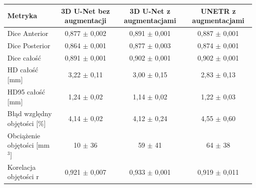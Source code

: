 \begin{tabular}{lccc}
\hline
Metryka & 3D U-Net bez augmentacji & 3D U-Net z augmentacjami & UNETR z augmentacjami \\ \hline
Dice Anterior & 0,877 $\pm$ 0,002 & 0,891 $\pm$ 0,001 & 0,887 $\pm$ 0,001 \\
Dice Posterior & 0,864 $\pm$ 0,001 & 0,877 $\pm$ 0,003 & 0,874 $\pm$ 0,001 \\
Dice całość & 0,891 $\pm$ 0,001 & 0,902 $\pm$ 0,001 & 0,902 $\pm$ 0,001 \\
HD całość [mm] & 3,22 $\pm$ 0,11 & 3,00 $\pm$ 0,15 & 2,83 $\pm$ 0,13 \\
HD95 całość [mm] & 1,24 $\pm$ 0,02 & 1,14 $\pm$ 0,02 & 1,22 $\pm$ 0,03 \\
Błąd względny objętości [\%] & 4,14 $\pm$ 0,02 & 4,12 $\pm$ 0,24 & 4,55 $\pm$ 0,60 \\
Obciążenie objętości [mm$^3$] & 10 $\pm$ 36 & 59 $\pm$ 41 & 64 $\pm$ 38 \\
Korelacja objętości r & 0,921 $\pm$ 0,007 & 0,933 $\pm$ 0,001 & 0,919 $\pm$ 0,011 \\
\hline
\end{tabular}